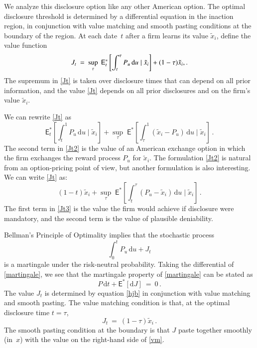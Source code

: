 \documentclass[authoryear,letterpaper,english,12pt]{elsarticle}
\theoremstyle{plain}
\numberwithin{lemma}{section}
\numberwithin{proposition}{section}
\numberwithin{equation}{section}
\numberwithin{figure}{section}
\newcommand{\D}{\mathrm{d}}
\newcommand{\mye}{\ensuremath{\mathsf{E}}}
\begin{document}
We analyze this disclosure option like any other American option. The optimal disclosure threshold is determined by a differential equation in the inaction region, in conjunction with value matching and smooth pasting conditions at the boundary of the region.     At each date~$t$ after a firm learns its value $\tilde x_i$, define the value function
\begin{equation}\label{Jt}
J_t \ = \  \sup_\tau \; \mye^*_t \left[\int_t^\tau P_u \,\D u \mid \tilde x_i \right] + (1-\tau)\tilde x_i\\,.
\end{equation}
The supremum in \eqref{Jt} is taken over disclosure times that can depend on all prior information, and the value \eqref{Jt} depends on all prior disclosures and on the firm's value $\tilde x_i$.  

We can rewrite \eqref{Jt} as
\begin{equation}\label{Jt2}
\mye^*_t\left[ \int_t^1 P_u \,\D u \mid \tilde x_i \right] + \sup_\tau \; \mye^*\left[\int_\tau^1(\tilde x_i - P_u)\,\D u \mid \tilde x_i\right]\,.
\end{equation}
The second term in \eqref{Jt2} is the value of an American exchange option in which the firm exchanges the reward process $P_u$ for $\tilde x_i$.  The formulation \eqref{Jt2} is natural from an option-pricing point of view, but another formulation is also interesting.  We can  write \eqref{Jt} as:
\begin{equation}\label{Jt3}
(1-t)\tilde x_i + \sup_\tau \; \mye^*\left[\int_t^\tau (P_u-\tilde x_i )\,\D u\mid \tilde x_i\right]\,.
\end{equation}
The first term in \eqref{Jt3} is the value the firm would achieve if disclosure were mandatory, and the second term is the value of plausible deniability.

Bellman's Principle of Optimality implies that the stochastic process
\begin{equation}\label{martingale}
\int_0^t P_u\,\D u + J_t
\end{equation}
is a martingale under the risk-neutral probability.
Taking the differential of \eqref{martingale}, we see that the martingale property of \eqref{martingale} can be stated as
\begin{equation}\label{hjb}
P\,\D t + \mye^*[\D J] \ = \ 0\,.
\end{equation}
The value $J_t$ is determined by equation \eqref{hjb} in conjunction with value matching and smooth pasting. 
The value matching condition is that, at the optimal disclosure time $t=\tau$,
\begin{equation}\label{vm}
J_t \ = \ (1-\tau)\tilde x_i\,.
\end{equation} 
The smooth pasting condition at the boundary is that $J$ paste together smoothly (in~$x$) with the value on the right-hand side of \eqref{vm}. 
\end{document}
